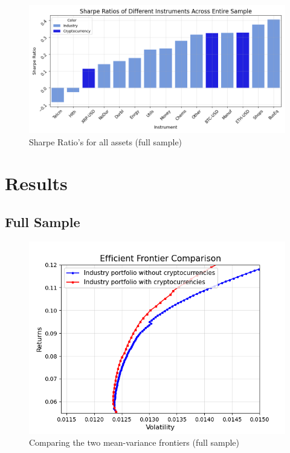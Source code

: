 \documentclass[12pt,a4paper]{article}
\begin{document}
\begin{figure}[H]
    \centering
    \includegraphics[width=1\linewidth]{Figures/SR_Entire_Sample.png}
    \caption{Sharpe Ratio's for all assets (full sample)}
    \label{fig:Sharpe}
\end{figure}


\section{Results}\label{sec:results}

\subsection{Full Sample}\label{sec:full sample}
\begin{figure}[H]
    \centering
    \includegraphics[width=1\linewidth]{Figures/Efficient_Frontier_Comparison_Full_Sample.png}
    \caption{Comparing the two mean-variance frontiers (full sample)}
    \label{fig:full}
\end{figure}
\end{document}
